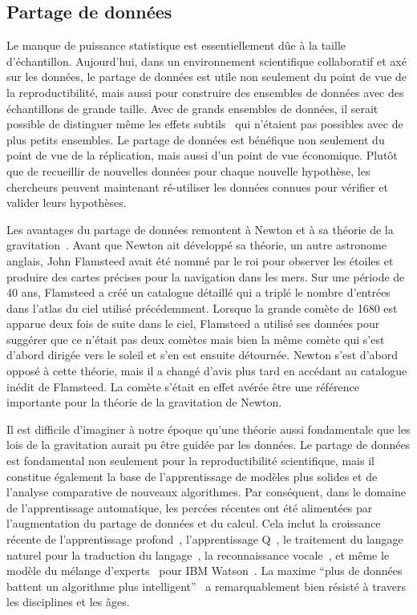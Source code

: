 \subsection*{Partage de données}
\label{sec:sommaire:intro_datasharing}
Le manque de puissance statistique est essentiellement dûe à la taille d’échantillon. Aujourd’hui, dans un environnement scientifique collaboratif et axé sur les données, le partage de données est utile non seulement du point de vue de la reproductibilité, mais aussi pour construire des ensembles de données avec des échantillons de grande taille. Avec de grands ensembles de données, il serait possible de distinguer même les effets subtils~\citep{smith2017statistical} qui n'étaient pas possibles avec de plus petits ensembles. Le partage de données est bénéfique non seulement du point de vue de la réplication, mais aussi d'un point de vue économique. Plutôt que de recueillir de nouvelles données pour chaque nouvelle hypothèse, les chercheurs peuvent maintenant ré-utiliser les données connues pour vérifier et valider leurs hypothèses.

Les avantages du partage de données remontent à Newton et à sa théorie de la gravitation~\citep{pointofview2013}. Avant que Newton ait développé sa théorie, un autre astronome anglais, John Flamsteed avait été nommé par le roi pour observer les étoiles et produire des cartes précises pour la navigation dans les mers. Sur une période de 40 ans, Flamsteed a créé un catalogue détaillé qui a triplé le nombre d'entrées dans l'atlas du ciel utilisé précédemment. Lorsque la grande comète de 1680 est apparue deux fois de suite dans le ciel, Flamsteed a utilisé ses données pour suggérer que ce n'était pas deux comètes mais bien la même comète qui s'est d'abord dirigée vers le soleil et s'en est ensuite détournée. Newton s'est d'abord opposé à cette théorie, mais il a changé d'avis plus tard en accédant au catalogue inédit de Flamsteed. La comète s'était en effet avérée être une référence importante pour la théorie de la gravitation de Newton.

Il est difficile d'imaginer à notre époque qu'une théorie aussi fondamentale que les lois de la gravitation aurait pu être guidée par les données. Le partage de données est fondamental non seulement pour la reproductibilité scientifique, mais il constitue également la base de l'apprentissage de modèles plus solides et de l'analyse comparative de nouveaux algorithmes. Par conséquent, dans le domaine de l'apprentissage automatique, les percées récentes ont été alimentées par l'augmentation du partage de données et du calcul. Cela inclut la croissance récente de l'apprentissage profond~\citep{deng2009imagenet}, l'apprentissage Q~\citep{watkins1992q, bellemare2013arcade}, le traitement du langage naturel pour la traduction du langage~\citep{halevy2009unreasonable}, la reconnaissance vocale~\citep{paul1992design}, et même le modèle du mélange d'experts~\citep{jacobs1991adaptive} pour IBM Watson~\citep{ferrucci2010building}. La maxime ``plus de données battent un algorithme plus intelligent''~\citep{domingos2012few} a remarquablement bien résisté à travers les disciplines et les âges.

